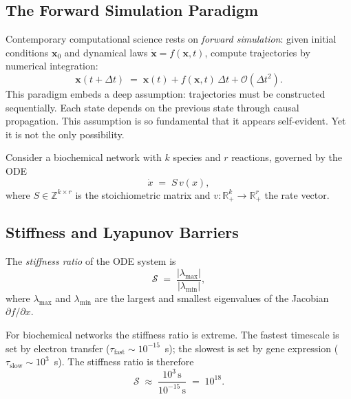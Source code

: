 \subsection{The Forward Simulation Paradigm}

Contemporary computational science rests on \emph{forward simulation}: given
initial conditions $\mathbf{x}_0$ and dynamical laws
$\dot{\mathbf{x}} = f(\mathbf{x}, t)$, compute trajectories by numerical
integration:
\begin{equation}
    \mathbf{x}(t + \Delta t)
    \;=\; \mathbf{x}(t) + f(\mathbf{x}, t)\,\Delta t + \mathcal{O}(\Delta t^2).
    \label{eq:forward}
\end{equation}
This paradigm embeds a deep assumption: trajectories must be constructed
sequentially.  Each state depends on the previous state through causal
propagation.  This assumption is so fundamental that it appears self-evident.
Yet it is not the only possibility.

Consider a biochemical network with $k$ species and $r$ reactions, governed by
the ODE
\begin{equation}
    \dot x \;=\; S\,v(x),
    \label{eq:ode}
\end{equation}
where $S\in\mathbb{Z}^{k\times r}$ is the stoichiometric matrix and
$v:\mathbb{R}^k_+\to\mathbb{R}^r_+$ the rate vector.

\subsection{Stiffness and Lyapunov Barriers}

\begin{definition}
\label{def:stiffness}
The \emph{stiffness ratio} of the ODE system  is
\begin{equation}
    \mathcal{S}
    \;=\; \frac{|\lambda_\mathrm{max}|}{|\lambda_\mathrm{min}|},
\end{equation}
where $\lambda_\mathrm{max}$ and $\lambda_\mathrm{min}$ are the largest and
smallest eigenvalues of the Jacobian $\partial f/\partial x$.
\end{definition}

For biochemical networks the stiffness ratio is extreme.  The fastest
timescale is set by electron transfer ($\tau_\mathrm{fast} \sim 10^{-15}$~s);
the slowest is set by gene expression ($\tau_\mathrm{slow} \sim 10^3$~s).
The stiffness ratio is therefore
\[
    \mathcal{S} \;\approx\; \frac{10^3\,\text{s}}{10^{-15}\,\text{s}}
    \;=\; 10^{18}.
\]


